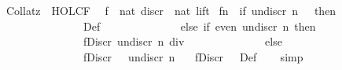 %
\begin{isabellebody}%
\def\isabellecontext{Collatz}%
%
\isadelimtheory
%
\endisadelimtheory
%
\isatagtheory
{}\isamarkupfalse%
\ Collatz\ \ HOLCF\ %
\endisatagtheory
{\isafoldtheory}%
%
\isadelimtheory
\isanewline
%
\endisadelimtheory
\isanewline
{}\isamarkupfalse%
\ f\ {\isacharcolon}{\isacharcolon}\ {\isachardoublequoteopen}nat\ discr\ {\isasymrightarrow}\ nat\ lift{\isachardoublequoteclose}\isanewline
{}\ {\isachardoublequoteopen}f{\isasymcdot}n\ {\isacharequal}\ {\isacharparenleft}if\ undiscr\ n\ {\isacharequal}\ {}\ then\isanewline
\ \ \ \ \ \ \ \ \ \ \ \ \ \ \ Def\ {}\isanewline
\ \ \ \ \ \ \ \ \ \ \ \ \ else\ if\ even\ {\isacharparenleft}undiscr\ n{\isacharparenright}\ then\isanewline
\ \ \ \ \ \ \ \ \ \ \ \ \ \ \ f{\isasymcdot}{\isacharparenleft}Discr\ {\isacharparenleft}{\isacharparenleft}undiscr\ n{\isacharparenright}\ div\ {}{\isacharparenright}{\isacharparenright}\isanewline
\ \ \ \ \ \ \ \ \ \ \ \ \ else\isanewline
\ \ \ \ \ \ \ \ \ \ \ \ \ \ \ f{\isasymcdot}{\isacharparenleft}Discr\ {\isacharparenleft}{}\ {\isacharasterisk}\ undiscr\ n\ {\isacharplus}\ {}{\isacharparenright}{\isacharparenright}{\isacharparenright}{\isachardoublequoteclose}\isanewline
\isanewline
{}\isamarkupfalse%
\ {\isachardoublequoteopen}f{\isasymcdot}{\isacharparenleft}Discr\ {}{}{\isacharparenright}\ {\isacharequal}\ Def\ {}{\isachardoublequoteclose}%
\isadelimproof
\ %
\endisadelimproof
%
\isatagproof
{}\isamarkupfalse%
\ simp%
\endisatagproof
{\isafoldproof}%
%
\isadelimproof
%
\endisadelimproof
\isanewline
%
\isadelimtheory
%
\endisadelimtheory
%
\isatagtheory
{}\isamarkupfalse%
%
\endisatagtheory
{\isafoldtheory}%
%
\isadelimtheory
%
\endisadelimtheory
\end{isabellebody}%
